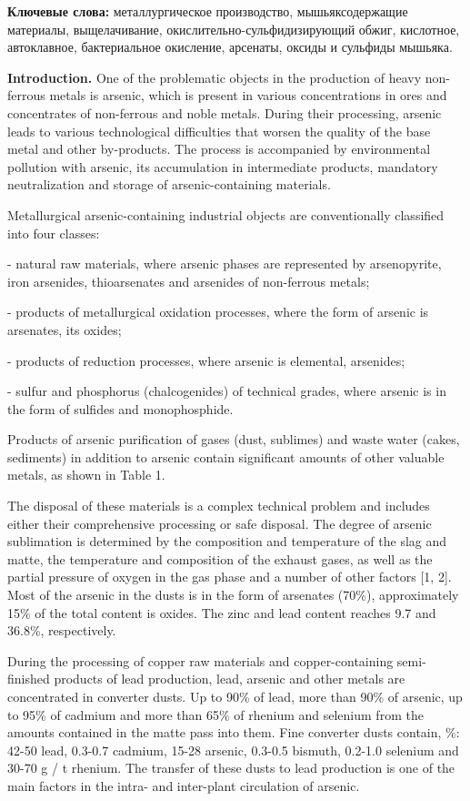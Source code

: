 {\bfseries Ключевые слова:} металлургическое производство, мышьяксодержащие
материалы, выщелачивание, окислительно-сульфидизирующий обжиг,
кислотное, автоклавное, бактериальное окисление, арсенаты, оксиды и
сульфиды мышьяка.

\begin{multicols}{2}
{\bfseries Introduction.} One of the problematic objects in the production
of heavy non-ferrous metals is arsenic, which is present in various
concentrations in ores and concentrates of non-ferrous and noble metals.
During their processing, arsenic leads to various technological
difficulties that worsen the quality of the base metal and other
by-products. The process is accompanied by environmental pollution with
arsenic, its accumulation in intermediate products, mandatory
neutralization and storage of arsenic-containing materials.

Metallurgical arsenic-containing industrial objects are conventionally
classified into four classes:

- natural raw materials, where arsenic phases are represented by
arsenopyrite, iron arsenides, thioarsenates and arsenides of non-ferrous
metals;

- products of metallurgical oxidation processes, where the form of
arsenic is arsenates, its oxides;

- products of reduction processes, where arsenic is elemental,
arsenides;

- sulfur and phosphorus (chalcogenides) of technical grades, where
arsenic is in the form of sulfides and monophosphide.

Products of arsenic purification of gases (dust, sublimes) and waste
water (cakes, sediments) in addition to arsenic contain significant
amounts of other valuable metals, as shown in Table 1.

The disposal of these materials is a complex technical problem and
includes either their comprehensive processing or safe disposal. The
degree of arsenic sublimation is determined by the composition and
temperature of the slag and matte, the temperature and composition of
the exhaust gases, as well as the partial pressure of oxygen in the gas
phase and a number of other factors {[}1, 2{]}. Most of the arsenic in
the dusts is in the form of arsenates (70\%), approximately 15\% of the
total content is oxides. The zinc and lead content reaches 9.7 and
36.8\%, respectively.

During the processing of copper raw materials and copper-containing
semi-finished products of lead production, lead, arsenic and other
metals are concentrated in converter dusts. Up to 90\% of lead, more
than 90\% of arsenic, up to 95\% of cadmium and more than 65\% of
rhenium and selenium from the amounts contained in the matte pass into
them. Fine converter dusts contain, \%: 42-50 lead, 0.3-0.7 cadmium,
15-28 arsenic, 0.3-0.5 bismuth, 0.2-1.0 selenium and 30-70 g / t
rhenium. The transfer of these dusts to lead production is one of the
main factors in the intra- and inter-plant circulation of arsenic.
\end{multicols}

